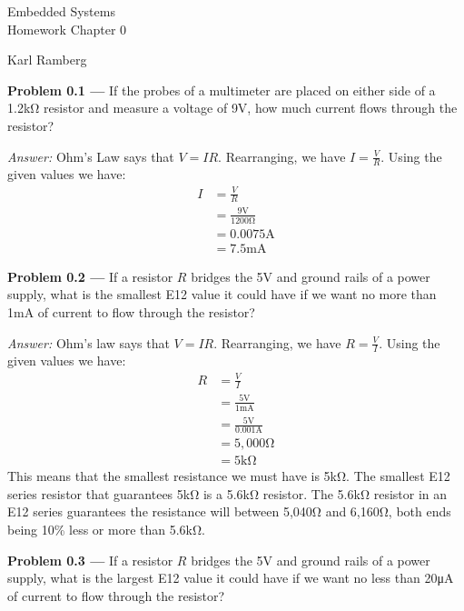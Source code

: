 \documentclass[11pt]{article}
\newcommand{\problem}[1]{\textbf{Problem #1 ---} }
\newcommand{\answer}{\textit{Answer: } }
\begin{document}
\thispagestyle{empty}

\begin{center}
{\large Embedded Systems}\\
Homework Chapter 0
\end{center}

\begin{flushright}
Karl Ramberg
\end{flushright}

\problem{0.1} If the probes of a multimeter are placed on either side of a
  1.2\si{\kilo\ohm} resistor and measure a voltage of 9\si{\volt}, how
  much current flows through the resistor?

\answer Ohm's Law says that $V = IR$.  Rearranging, we have $I = \frac{V}{R}$.
Using the given values we have:
\begin{align*}
I &= \frac{V}{R}\\
  &= \frac{9\si{\volt}}{1200\si{\ohm}}\\
  &= 0.0075\si{\ampere}\\
  &= 7.5\si{\milli\ampere}
\end{align*}

\problem{0.2} If a resistor $R$ bridges the 5\si{\volt} and ground
rails of a power supply, what is the smallest E12 value it could have
if we want no more than 1\si{\milli\ampere} of current to flow through
the resistor?

\answer Ohm's law says that $V = IR$. Rearranging, we have $R = \frac{V}{I}$.
Using the given values we have:
\begin{align*}
R &= \frac{V}{I}\\
  &= \frac{5\si{\volt}}{1\si{\milli\ampere}}\\
  &= \frac{5\si{\volt}}{0.001\si{\ampere}}\\
  &= 5,000\si{\ohm}\\
  &= 5\si{\kilo\ohm}
\end{align*}
This means that the smallest resistance we must have is 5\si{\kilo\ohm}.
The smallest E12 series resistor that guarantees 5\si{\kilo\ohm} is a 5.6\si{\kilo\ohm} resistor. 
The 5.6\si{\kilo\ohm} resistor in an E12 series guarantees the resistance will between 5,040\si{\ohm} and 6,160\si{\ohm}, both ends being 10\% less or more than 5.6\si{\kilo\ohm}. 

\problem{0.3} If a resistor $R$ bridges the 5\si{\volt} and ground rails
of a power supply, what is the largest E12 value it could have if we
want no less than 20\si{\micro\ampere} of current to flow through the
resistor?
\end{document}
